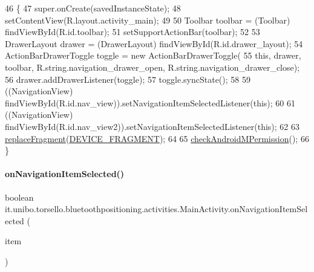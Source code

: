 \begin{DoxyCode}
46                                                        \{
47         super.onCreate(savedInstanceState);
48         setContentView(R.layout.activity\_main);
49 
50         Toolbar toolbar = (Toolbar) findViewById(R.id.toolbar);
51         setSupportActionBar(toolbar);
52 
53         DrawerLayout drawer = (DrawerLayout) findViewById(R.id.drawer\_layout);
54         ActionBarDrawerToggle toggle = \textcolor{keyword}{new} ActionBarDrawerToggle(
55                 \textcolor{keyword}{this}, drawer, toolbar, R.string.navigation\_drawer\_open, R.string.navigation\_drawer\_close);
56         drawer.addDrawerListener(toggle);
57         toggle.syncState();
58 
59         ((NavigationView) findViewById(R.id.nav\_view)).setNavigationItemSelectedListener(\textcolor{keyword}{this});
60 
61         ((NavigationView) findViewById(R.id.nav\_view2)).setNavigationItemSelectedListener(\textcolor{keyword}{this});
62 
63         \hyperlink{classit_1_1unibo_1_1torsello_1_1bluetoothpositioning_1_1activities_1_1MainActivity_a98db4478d28cd91118138d0b652ceb2c_a98db4478d28cd91118138d0b652ceb2c}{replaceFragment}(\hyperlink{classit_1_1unibo_1_1torsello_1_1bluetoothpositioning_1_1activities_1_1MainActivity_a2f77c0245ac2525dc58905e38e1817d1_a2f77c0245ac2525dc58905e38e1817d1}{DEVICE\_FRAGMENT});
64 
65         \hyperlink{classit_1_1unibo_1_1torsello_1_1bluetoothpositioning_1_1activities_1_1MainActivity_ab762aac3d11f5b0ccc6042a140804d5d_ab762aac3d11f5b0ccc6042a140804d5d}{checkAndroidMPermission}();
66     \}
\end{DoxyCode}
\hypertarget{classit_1_1unibo_1_1torsello_1_1bluetoothpositioning_1_1activities_1_1MainActivity_a7cfc0a2ee94c12afaac3b7472eeb75b7_a7cfc0a2ee94c12afaac3b7472eeb75b7}{}\label{classit_1_1unibo_1_1torsello_1_1bluetoothpositioning_1_1activities_1_1MainActivity_a7cfc0a2ee94c12afaac3b7472eeb75b7_a7cfc0a2ee94c12afaac3b7472eeb75b7} 
\paragraph{\texorpdfstring{on\+Navigation\+Item\+Selected()}{onNavigationItemSelected()}}
{\footnotesize\ttfamily boolean it.\+unibo.\+torsello.\+bluetoothpositioning.\+activities.\+Main\+Activity.\+on\+Navigation\+Item\+Selected (\begin{DoxyParamCaption}\item[{Menu\+Item}]{item }\end{DoxyParamCaption})}


